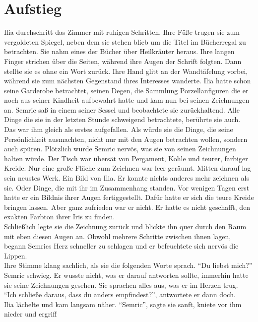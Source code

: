 \chapter{Aufstieg}

Ilia durchschritt das Zimmer mit ruhigen Schritten. Ihre Füße trugen sie zum vergoldeten Spiegel, 
neben dem sie stehen blieb um die Titel im Bücherregal zu betrachten. Sie nahm eines der Bücher 
über Heilkräuter heraus. Ihre langen Finger strichen über die Seiten, während ihre Augen der 
Schrift folgten. Dann stellte sie es ohne ein Wort zurück. Ihre Hand glitt an der Wandtäfelung 
vorbei, während sie zum nächsten Gegenstand ihres Interesses wanderte. Ilia hatte schon 
seine Garderobe betrachtet, seinen Degen, die Sammlung Porzellanfiguren die er noch aus seiner 
Kindheit aufbewahrt hatte und kam nun bei seinen Zeichnungen an. Semric saß in einem seiner Sessel 
und beobachtete sie zurückhaltend. Alle Dinge die sie in der letzten Stunde schweigend betrachtete, 
berührte sie auch. Das war ihm gleich als erstes aufgefallen. Als würde sie die Dinge, die seine 
Persönlichkeit ausmachten, nicht nur mit den Augen betrachten wollen, sondern auch spüren. 
Plötzlich wurde Semric nervös, was sie von seinen Zeichnungen halten würde. Der Tisch war übersät 
von Pergament, Kohle und teurer, farbiger Kreide. Nur eine große Fläche zum Zeichnen war 
leer geräumt. Mitten darauf lag sein neustes Werk. Ein Bild von Ilia. Er konnte nichts anderes 
mehr zeichnen als sie. Oder Dinge, die mit ihr im Zusammenhang standen. Vor wenigen Tagen erst 
hatte er ein Bildnis ihrer Augen fertiggestellt. Dafür hatte er sich die teure Kreide bringen 
lassen. Aber ganz zufrieden war er nicht. Er hatte es nicht geschafft, den exakten Farbton ihrer 
Iris zu finden.\\
Schließlich legte sie die Zeichnung zurück und blickte ihn quer durch den Raum mit eben diesen 
Augen an. Obwohl mehrere Schritte zwischen ihnen lagen, begann Semrics Herz schneller zu schlagen 
und er befeuchtete sich nervös die Lippen.\\
Ihre Stimme klang sachlich, als sie die folgenden Worte sprach. ``Du liebst mich?''\\
Semric schwieg. Er wusste nicht, was er darauf antworten sollte, immerhin hatte sie seine 
Zeichnungen gesehen. Sie sprachen alles aus, was er im Herzen trug.\\
``Ich schließe daraus, dass du anders empfindest?'', antwortete er dann doch.\\
Ilia lächelte und kam langsam näher. ``Semric'', sagte sie sanft, kniete vor ihm nieder und ergriff 
